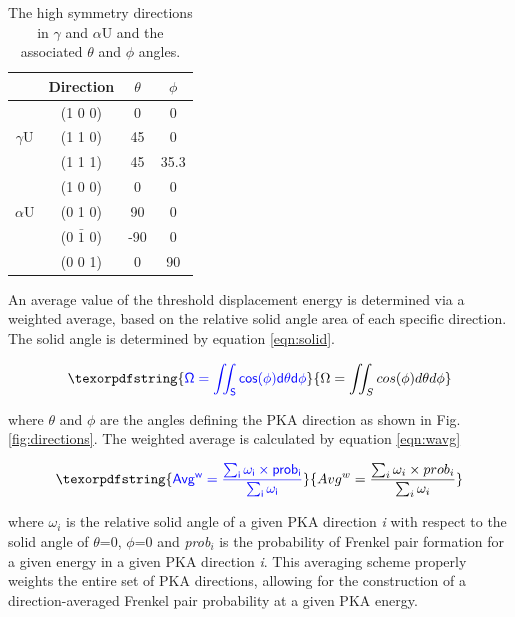 \documentclass[review]{elsarticle}
\providecommand{\DIFaddtex}[1]{{\protect\color{blue} \sf #1}} %
\providecommand{\DIFaddbegin}{} %
\providecommand{\DIFadd}[1]{\texorpdfstring{\DIFaddtex{#1}}{#1}} %
\newcommand{\DIFaddincludegraphics}[2][]{{\color{blue}\fbox{\DIFOincludegraphics[#1]{#2}}}} %
\DeclareRobustCommand{\DIFaddbegin}{\DIFOaddbegin \let\includegraphics\DIFaddincludegraphics} %
\begin{document}
\begin{table}[h]
\caption{The high symmetry directions in $\gamma$ and $\alpha$U and the associated $\theta$ and $\phi$ angles.} \label{tab:dirs}
\begin{center}
\begin{tabular}{|c|c|c|c|}
	\hline
	& Direction & $\theta$ & $\phi$ \\
	 \hline
	 & (1 0 0) & 0 & 0 \\
	$\gamma$U & (1 1 0) & 45 & 0 \\
	& (1 1 1) & 45 & 35.3 \\
	 \hline
	 	 & (1 0 0) & 0 & 0 \\
	$\alpha$U & (0 1 0) & 90 & 0 \\
	& (0 $\bar{1}$ 0) & -90 & 0 \\
	& (0 0 1) & 0 & 90 \\
	 \hline
\end{tabular}
\end{center}
\label{default}
\end{table}

\FloatBarrier

\DIFaddbegin \DIFadd{An average value of the threshold displacement energy is determined via a weighted average, based on the relative solid angle area of each specific direction. The solid angle is determined by equation \ref{eqn:solid}. 
}

\begin{equation}
\DIFadd{\label{eqn:solid}
\Omega = \iint_S cos(\phi) d\theta d\phi
}\end{equation} 

\DIFadd{where $\theta$ and $\phi$ are the angles defining the PKA direction as shown in Fig. \ref{fig:directions}. The weighted average is calculated by equation \ref{eqn:wavg}
}

\begin{equation}
\DIFadd{\label{eqn:wavg}
Avg^{w} = \frac{\sum_i \omega_{i} \times prob_{i}}{\sum_i \omega_{i} }
}\end{equation} 

\DIFadd{where $\omega_{i}$ is the relative solid angle of a given PKA direction \textit{i} with respect to the solid angle of $\theta$=0, $\phi$=0 and \textit{prob$_{i}$} is the probability of Frenkel pair formation for a given energy in a given PKA direction \textit{i}. This averaging scheme properly weights the entire set of PKA directions, allowing for the construction of a direction-averaged Frenkel pair probability at a given PKA energy.
}
\end{document}
